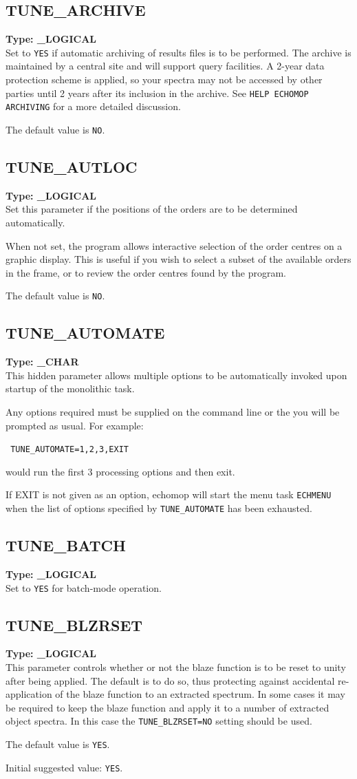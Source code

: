 \documentclass[11pt,twoside]{article}
\makeatletter
\newcommand{\xlabel}[1]{}
\newcommand{\indexcmdname}[1]{\index{#1@\protect\cmdname{#1}}}
\renewcommand{\indexcmdname}[1]{}
\newcommand{\cmdname}{\begingroup \catcode`\_=12 \realcmdname}
\newcommand{\realcmdname}[1]{\endgroup\texttt{#1}}
\newcommand{\echparameter}[4]
{
\item [#1 = #3] \mbox{}\label{par_#2}\indexcmdname{#2}
\\
#4
}
\renewcommand{\echparameter}[4]
{
  \subsection{\xlabel{par_#2}\label{par_#2}{\bf #1}}
  {\bf Type: #3}\\
#4
}
\makeatother
\begin{document}
\echparameter{TUNE\_ARCHIVE}{TUNE_ARCHIVE}{
 \_LOGICAL
}{
 Set to \texttt{YES} if automatic archiving of results files is to be
 performed.
 The archive is maintained by a central site and will support query
 facilities.  A 2-year data protection scheme is applied, so your
 spectra may not be accessed by other parties until 2 years after
 its inclusion in the archive.  See {\tt HELP ECHOMOP ARCHIVING} for a
 more detailed discussion.

 The default value is \texttt{NO}.
}

\echparameter{TUNE\_AUTLOC}{TUNE_AUTLOC}{
 \_LOGICAL
}{
 Set this parameter if the positions of the orders are to be determined
 automatically.

 When not set, the program allows interactive selection of the order
 centres on a graphic display.  This is useful if you wish
 to select a subset of the available orders in the frame, or to
 review the order centres found by the program.

 The default value is \texttt{NO}.
}

\echparameter{TUNE\_AUTOMATE}{TUNE_AUTOMATE}{
 \_CHAR
}{
 This hidden parameter allows multiple options to be automatically
 invoked upon startup of the monolithic task.

 Any options required must be supplied on the command line or
 the you will be prompted as usual.  For example:

\texttt{   TUNE}{\tt\_AUTOMATE=1,2,3,EXIT}

 would run the first 3 processing options and then exit.

 If EXIT is not given as an option, {\sc echomop} will start the menu task
 {\tt ECHMENU} when the list of options specified by {\tt TUNE\_AUTOMATE} has
 been exhausted.
}

\echparameter{TUNE\_BATCH}{TUNE_BATCH}{
 \_LOGICAL
}{
 Set to \texttt{YES} for batch-mode operation.
}

\echparameter{TUNE\_BLZRSET}{TUNE_BLZRSET}{
 \_LOGICAL
}{
 This parameter controls whether or not the blaze function is to be
 reset to unity after being applied.  The default is to do so, thus
 protecting against accidental re-application of the blaze
 function to an extracted spectrum.  In some cases it may be
 required to keep the blaze function and apply it to a number of
 extracted object spectra.  In this case the {\tt TUNE\_BLZRSET=NO}
 setting should be used.

 The default value is \texttt{YES}.

 Initial suggested value: \texttt{YES}.
}
\end{document}
